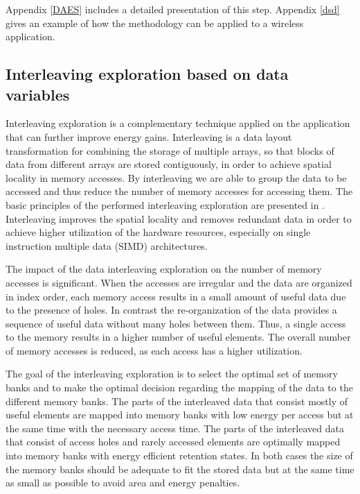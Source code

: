 Appendix \ref{DAES} includes a detailed presentation of this step. Appendix \ref{dsd} gives an example of how the methodology can be applied to a wireless application.

\subsection{Interleaving exploration based on data variables}

Interleaving exploration is a complementary technique applied on the application that can further improve energy gains.
Interleaving is a data layout transformation for combining the storage of multiple arrays, so that blocks of data from different arrays are stored contiguously, in order to achieve spatial locality in memory accesses.
By interleaving we are able to group the data to be accessed and thus reduce the number of memory accesses for accessing them.
The basic principles of the performed interleaving exploration are presented in \cite{sharma2013data}.
Interleaving improves the spatial locality and removes redundant data in order to achieve higher  utilization of the hardware resources, especially on single instruction multiple data (SIMD)  architectures.

The impact of the data interleaving exploration on the number of memory accesses is significant.
When the accesses are irregular and the data are organized in index order, each memory access results in a small amount of useful data due to the presence of holes.
In contrast the re-organization of the data provides a sequence of useful data without many holes between them.
Thus, a single access to the memory results in a higher number of useful elements.
The overall number of memory accesses is reduced, as each access has a higher utilization.

The goal of the interleaving exploration is to select the optimal set of memory banks and to make  the optimal decision regarding the mapping of the data to the different memory banks.
The parts of the interleaved data that consist mostly of useful elements are mapped into memory banks with low energy per access but at the same time with the necessary access time.
The parts of the interleaved data that consist of access holes and rarely accessed elements are optimally mapped into memory banks with energy efficient retention states.
In both cases the size of  the memory banks should be adequate to fit the stored data but at the same time as small as possible to avoid area and energy penalties.

